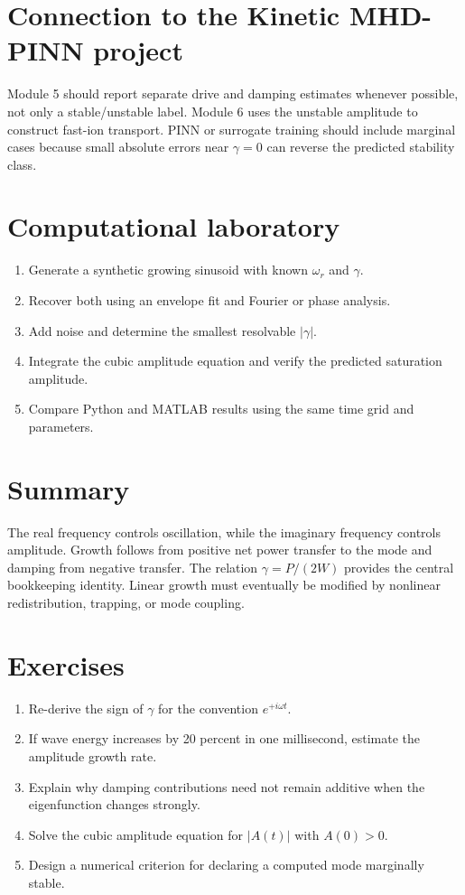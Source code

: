 \documentclass[11pt]{article}
\begin{document}
\section{Connection to the Kinetic MHD-PINN project}
Module 5 should report separate drive and damping estimates whenever possible, not only a stable/unstable label. Module 6 uses the unstable amplitude to construct fast-ion transport. PINN or surrogate training should include marginal cases because small absolute errors near $\gamma=0$ can reverse the predicted stability class.

\section{Computational laboratory}
\begin{enumerate}[leftmargin=1.6em]
\item Generate a synthetic growing sinusoid with known $\omega_r$ and $\gamma$.
\item Recover both using an envelope fit and Fourier or phase analysis.
\item Add noise and determine the smallest resolvable $|\gamma|$.
\item Integrate the cubic amplitude equation and verify the predicted saturation amplitude.
\item Compare Python and MATLAB results using the same time grid and parameters.
\end{enumerate}

\section{Summary}
The real frequency controls oscillation, while the imaginary frequency controls amplitude. Growth follows from positive net power transfer to the mode and damping from negative transfer. The relation $\gamma=P/(2W)$ provides the central bookkeeping identity. Linear growth must eventually be modified by nonlinear redistribution, trapping, or mode coupling.

\section{Exercises}
\begin{enumerate}[leftmargin=1.6em]
\item Re-derive the sign of $\gamma$ for the convention $e^{+i\omega t}$.
\item If wave energy increases by 20 percent in one millisecond, estimate the amplitude growth rate.
\item Explain why damping contributions need not remain additive when the eigenfunction changes strongly.
\item Solve the cubic amplitude equation for $|A(t)|$ with $A(0)>0$.
\item Design a numerical criterion for declaring a computed mode marginally stable.
\end{enumerate}
\end{document}

